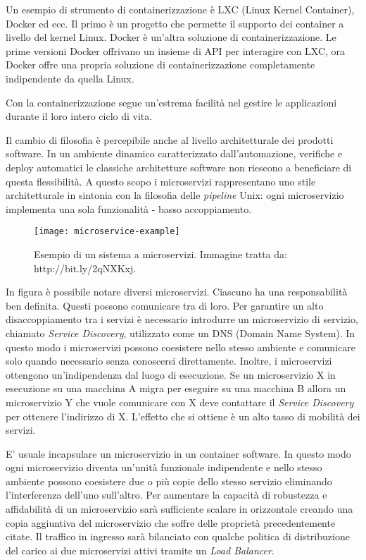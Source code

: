 Un esempio di strumento di containerizzazione è LXC (Linux Kernel Container), Docker ed ecc. Il primo è un progetto che permette il supporto dei container a livello del kernel Linux. Docker è un'altra soluzione di containerizzazione. Le prime versioni Docker offrivano un insieme di API per interagire con LXC, ora Docker offre una propria soluzione di containerizzazione completamente indipendente da quella Linux. 

Con la containerizzazione segue un'estrema facilità nel gestire le applicazioni durante il loro intero ciclo di vita. 

Il cambio di filosofia è percepibile anche al livello architetturale dei prodotti software. In un ambiente dinamico caratterizzato dall'automazione, verifiche e deploy automatici le classiche architetture software non riescono a beneficiare di questa flessibilità. A questo scopo i microservizi rappresentano uno stile architetturale in sintonia con la filosofia delle \textit{pipeline} Unix: ogni microservizio implementa una sola funzionalità - basso accoppiamento.

\begin{figure}[htbp]
	\begin{center}
		\texttt{[image: microservice-example]}
		\caption{Esempio di un sistema a microservizi. Immagine tratta da: http://bit.ly/2qNXKxj.}
	\end{center}
\end{figure}

In figura è possibile notare diversi microservizi. Ciascuno ha una responsabilità
ben definita. Questi possono comunicare tra di loro. Per garantire un alto disaccoppiamento tra i servizi è necessario introdurre un microservizio di servizio, chiamato \textit{Service Discovery}, utilizzato come un DNS (Domain Name System). In questo modo i microservizi possono coesistere nello stesso ambiente e comunicare solo quando necessario senza conoscersi direttamente. Inoltre, i microservizi ottengono un'indipendenza dal luogo di esecuzione. Se un microservizio X in esecuzione su una macchina A migra per eseguire su una macchina B allora un microservizio Y che vuole comunicare con X deve contattare il \textit{Service Discovery} per ottenere l'indirizzo di X. L'effetto che si ottiene è un alto tasso di mobilità dei servizi.  

E' usuale incapsulare un microservizio in un container software. In questo modo 
ogni microservizio diventa un'unità funzionale indipendente e nello stesso ambiente possono coesistere due o più copie dello stesso servizio eliminando l'interferenza dell'uno sull'altro. 
Per aumentare la capacità di robustezza e affidabilità di un microservizio sarà 
sufficiente scalare in orizzontale creando una copia aggiuntiva del microservizio che soffre delle proprietà precedentemente citate. 
Il traffico in ingresso sarà bilanciato con qualche politica di distribuzione del carico ai due microservizi attivi tramite un \textit{Load Balancer}. 

